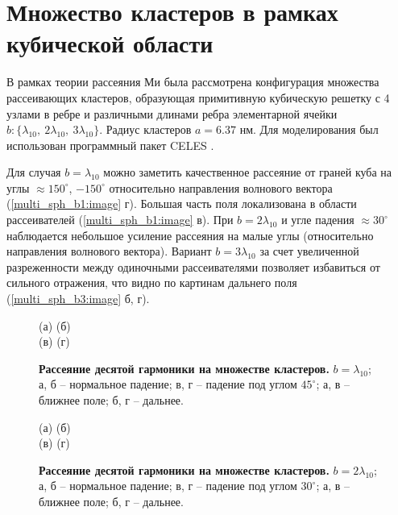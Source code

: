 \section{Множество кластеров в рамках кубической области}

В рамках теории рассеяния Ми была рассмотрена конфигурация множества рассеивающих кластеров, образующая примитивную кубическую решетку с 4 узлами в ребре и различными длинами ребра элементарной ячейки $b : \{\lambda_{10},\:2\lambda_{10},\:3\lambda_{10}\}$. Радиус кластеров $a = 6.37$ нм. Для моделирования был использован программный пакет CELES \cite{celes}.

Для случая $b = \lambda_{10}$ можно заметить качественное рассеяние от граней куба на углы $\approx 150^{\circ}$, $-150^{\circ}$ относительно направления волнового вектора (\autoref{multi_sph_b1:image} г). Большая часть поля локализована в области рассеивателей (\autoref{multi_sph_b1:image} в). При $b = 2\lambda_{10}$ и угле падения $\approx 30^{\circ}$ наблюдается небольшое усиление рассеяния на малые углы (относительно направления волнового вектора). Вариант $b = 3\lambda_{10}$ за счет увеличенной разреженности между одиночными рассеивателями позволяет избавиться от сильного отражения, что видно по картинам дальнего поля (\autoref{multi_sph_b3:image} б, г). 

\begin{figure}[H]
    (а)\:
    (б)\:
    \\(в)\:
    (г)\:
    \caption{\textbf{Рассеяние десятой гармоники на множестве кластеров.} $b = \lambda_{10}$; а, б -- нормальное падение; в, г -- падение под углом $45^{\circ}$; а, в -- ближнее поле; б, г -- дальнее.}
    \label{multi_sph_b1:image}
\end{figure}

\begin{figure}[H]
    (а)\:
    (б)\:
    \\(в)\:
    (г)\:
    \caption{\textbf{Рассеяние десятой гармоники на множестве кластеров.} $b = 2\lambda_{10}$; а, б -- нормальное падение; в, г -- падение под углом $30^{\circ}$; а, в -- ближнее поле; б, г -- дальнее.}
    \label{multi_sph_b2:image}
\end{figure}

